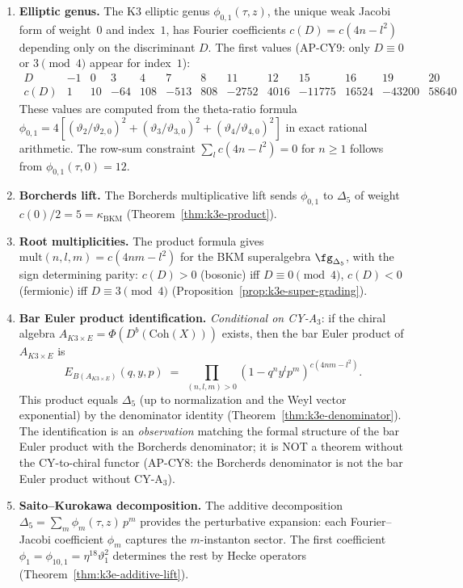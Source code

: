 \begin{enumerate}[label=\textup{Step \arabic*.}]
\item \textbf{Elliptic genus.}
The K3 elliptic genus $\phi_{0,1}(\tau, z)$,
the unique weak Jacobi form of weight~$0$ and index~$1$,
has Fourier coefficients $c(D) = c(4n - l^2)$
depending only on the discriminant $D$.
The first values (AP-CY9: only $D \equiv 0$ or $3 \pmod{4}$ appear
for index~$1$):
\[
\begin{array}{c|cccccccccccc}
D & -1 & 0 & 3 & 4 & 7 & 8 & 11 & 12 & 15 & 16 & 19 & 20 \\
\hline
c(D) & 1 & 10 & -64 & 108 & -513 & 808 & -2752 & 4016 & -11775 & 16524 & -43200 & 58640
\end{array}
\]
These values are computed from the theta-ratio formula
$\phi_{0,1} = 4[(\vartheta_2/\vartheta_{2,0})^2 + (\vartheta_3/\vartheta_{3,0})^2 + (\vartheta_4/\vartheta_{4,0})^2]$
in exact rational arithmetic.
The row-sum constraint
$\sum_l c(4n - l^2) = 0$ for $n \geq 1$
follows from $\phi_{0,1}(\tau, 0) = 12$.

\item \textbf{Borcherds lift.}
The Borcherds multiplicative lift sends $\phi_{0,1}$ to $\Delta_5$
of weight $c(0)/2 = 5 = \kappa_{\mathrm{BKM}}$
(Theorem~\ref{thm:k3e-product}).

\item \textbf{Root multiplicities.}
The product formula gives
$\mathrm{mult}(n,l,m) = c(4nm - l^2)$ for the BKM superalgebra
$\fg_{\Delta_5}$, with the sign determining parity:
$c(D) > 0$ (bosonic) iff $D \equiv 0 \pmod{4}$,
$c(D) < 0$ (fermionic) iff $D \equiv 3 \pmod{4}$
(Proposition~\ref{prop:k3e-super-grading}).

\item \textbf{Bar Euler product identification.}
\emph{Conditional on \textup{CY-A$_3$}}: if the chiral algebra
$A_{K3 \times E} = \Phi(D^b(\mathrm{Coh}(X)))$ exists, then the
bar Euler product of $A_{K3 \times E}$ is
\[
E_{B(A_{K3 \times E})}(q, y, p)
\;=\;
\prod_{(n,l,m) > 0}
(1 - q^n y^l p^m)^{c(4nm - l^2)}.
\]
This product equals $\Delta_5$ (up to normalization and the Weyl
vector exponential) by the denominator identity
(Theorem~\ref{thm:k3e-denominator}).
The identification is an \emph{observation} matching the formal
structure of the bar Euler product with the Borcherds denominator;
it is NOT a theorem without the CY-to-chiral functor
(AP-CY8: the Borcherds denominator is not the bar Euler product
without CY-A$_3$).

\item \textbf{Saito--Kurokawa decomposition.}
The additive decomposition
$\Delta_5 = \sum_m \phi_m(\tau, z) \, p^m$
provides the perturbative expansion: each Fourier--Jacobi
coefficient $\phi_m$ captures the $m$-instanton sector.
The first coefficient $\phi_1 = \phi_{10,1} = \eta^{18}\vartheta_1^2$
determines the rest by Hecke operators
(Theorem~\ref{thm:k3e-additive-lift}).
\end{enumerate}

